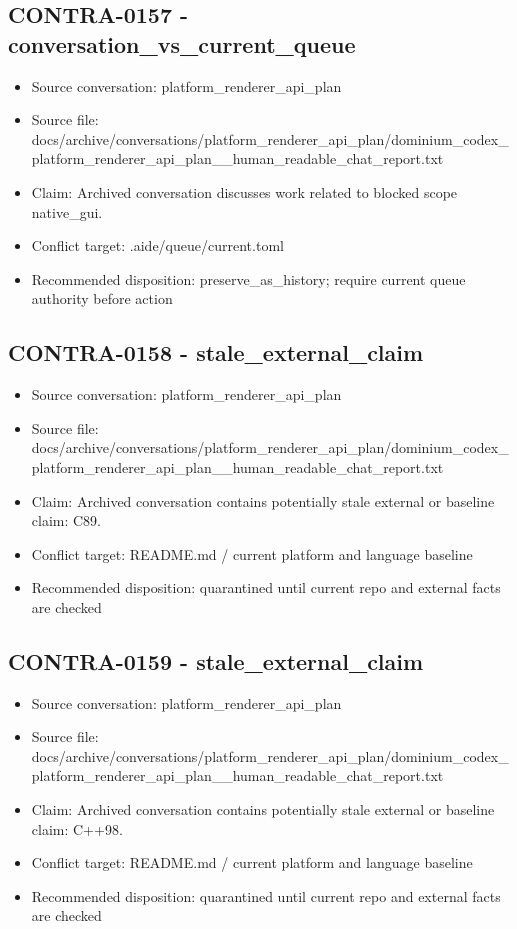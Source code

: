 \documentclass[11pt,a4paper]{report}
\begin{document}
\subsection{CONTRA-0157 - conversation\_vs\_current\_queue}

\begin{itemize}
\item Source conversation: platform\_renderer\_api\_plan
\item Source file: docs/archive/conversations/platform\_renderer\_api\_plan/dominium\_codex\_platform\_renderer\_api\_plan\_\_human\_readable\_chat\_report.txt
\item Claim: Archived conversation discusses work related to blocked scope native\_gui.
\item Conflict target: .aide/queue/current.toml
\item Recommended disposition: preserve\_as\_history; require current queue authority before action
\end{itemize}

\subsection{CONTRA-0158 - stale\_external\_claim}

\begin{itemize}
\item Source conversation: platform\_renderer\_api\_plan
\item Source file: docs/archive/conversations/platform\_renderer\_api\_plan/dominium\_codex\_platform\_renderer\_api\_plan\_\_human\_readable\_chat\_report.txt
\item Claim: Archived conversation contains potentially stale external or baseline claim: C89.
\item Conflict target: README.md / current platform and language baseline
\item Recommended disposition: quarantined until current repo and external facts are checked
\end{itemize}

\subsection{CONTRA-0159 - stale\_external\_claim}

\begin{itemize}
\item Source conversation: platform\_renderer\_api\_plan
\item Source file: docs/archive/conversations/platform\_renderer\_api\_plan/dominium\_codex\_platform\_renderer\_api\_plan\_\_human\_readable\_chat\_report.txt
\item Claim: Archived conversation contains potentially stale external or baseline claim: C++98.
\item Conflict target: README.md / current platform and language baseline
\item Recommended disposition: quarantined until current repo and external facts are checked
\end{itemize}
\end{document}
